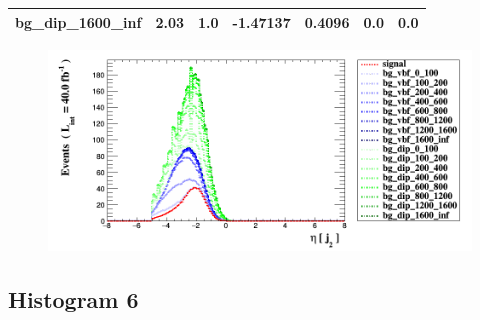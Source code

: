 \documentclass[a4paper, 10pt]{article}
\begin{document}
\begin{table}[H]
\begin{center}
\begin{tabular}{|m{23.0mm}|m{23.0mm}|m{18.0mm}|m{19.0mm}|m{19.0mm}|m{19.0mm}|m{19.0mm}|}
      \hline
      {\cellcolor{white}         bg\_dip\_1600\_inf}& {\cellcolor{white}         2.03}& {\cellcolor{white}         1.0}& {\cellcolor{white}         -1.47137}& {\cellcolor{white}         0.4096}& {\cellcolor{green}         0.0}& {\cellcolor{green}         0.0}\\
\hline
    \end{tabular}
  \end{center}
\end{table}

\begin{figure}[H]
  \begin{center}
    \includegraphics[scale=0.45]{selection_4.png}\\
\caption{   }
  \end{center}
\end{figure}
      \newpage
\subsection{ Histogram 6}
\end{document}
